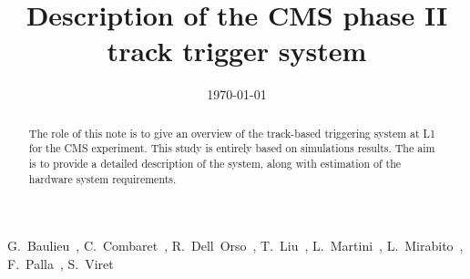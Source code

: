 \documentclass{cmspaper}
\begin{document}
\begin{titlepage}
\date{\today}
\title{Description of the CMS phase II track trigger system}
\begin{Authlist}
G.~Baulieu~, C.~Combaret~, R.~Dell~Orso~, T.~Liu~, L.~Martini~, L.~Mirabito~, F.~Palla~, S.~Viret~
\end{Authlist}


\begin{abstract}
The role of this note is to give an overview of the track-based triggering system at L1 for the CMS experiment. This study is entirely based on simulations results. The aim is to provide a detailed description of the system, along with estimation of the hardware system requirements. 
\end{abstract}
\end{titlepage}
\newpage
\tableofcontents
\newpage











\newpage
\thispagestyle{empty}

\begin{thebibliography}{99}








\end{thebibliography}

\end{document}
